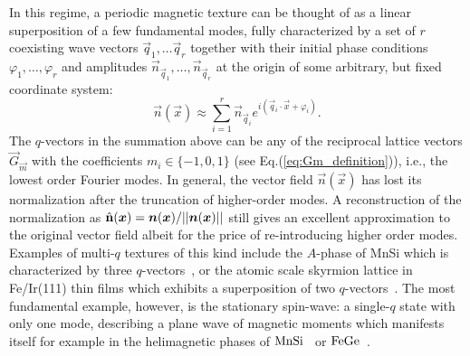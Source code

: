 \documentclass[submission, Phys]{SciPost}
\begin{document}
In this regime, a periodic magnetic texture can be thought of as a linear superposition of a few fundamental modes, fully characterized by a set of $r$ coexisting wave vectors $\vec{q}_1, \ldots \vec{q}_r$ together with their initial phase conditions $\varphi_1, \ldots, \varphi_r$ and amplitudes $\vec{n}_{\vec{q}_{1}},\ldots, \vec{n}_{\vec{q}_{r}}$ at the origin of some arbitrary, but fixed coordinate system:
\begin{equation}
    \vec{n}(\vec{x})\approx \sum_{i=1}^r  \vec{n}_{\vec{q}_{i}}e^{i(\vec{q}_i\cdot\vec{x}+\varphi_{i})}.
    \label{eq:fourier_modes}
\end{equation}
The $q$-vectors in the summation above can be any of the reciprocal lattice vectors $\vec{G}_{\vec{m}}$ with the coefficients $m_i \in \lbrace -1,0,1\rbrace$ (see Eq.(\ref{eq:Gm_definition})), i.e., the lowest order Fourier modes.
In general, the vector field $\vec{n}(\vec{x})$ has lost its normalization after the truncation of higher-order modes. 
A reconstruction of the normalization as $\hat{\mathbf{n}}(\boldsymbol{x})=\boldsymbol{n}(\boldsymbol{x})/||\boldsymbol{n}(\boldsymbol{x})||$ still gives an excellent approximation to the original vector field  albeit for the price of re-introducing higher order modes.
Examples of multi-$q$ textures of this kind include the $A$-phase of MnSi which is characterized by three $q$-vectors~\cite{Neubauer2009}, or the atomic scale skyrmion lattice in Fe/Ir(111) thin films which exhibits a superposition of two $q$-vectors~\cite{Heinze2011}.
The most fundamental example, however, is the stationary spin-wave: a single-$q$ state with only one mode, describing a plane wave of magnetic moments which manifests itself for example in the helimagnetic phases of $\ce{MnSi}$~\cite{Ishikawa1976, Hansen1977,Plumer1981, Bauer2017} or $\ce{FeGe}$~\cite{Ludgren1970,Lebech1989}.
\end{document}
